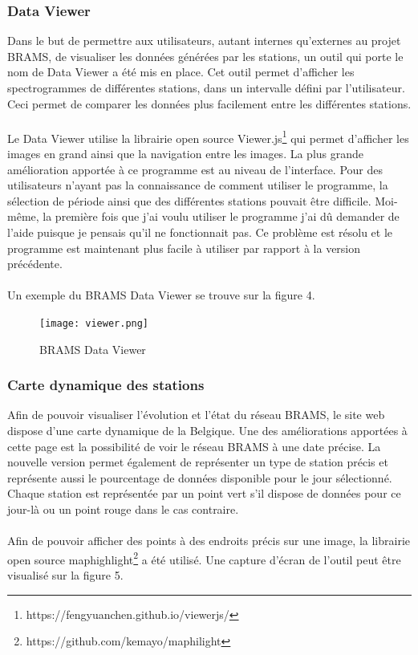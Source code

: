 \documentclass[11pt]{article}
\begin{document}
\subsubsection{Data Viewer}
Dans le but de permettre aux utilisateurs, autant internes qu'externes au projet BRAMS, de visualiser les données générées par les stations, un outil qui porte le nom de Data Viewer a été mis en place.
Cet outil permet d'afficher les spectrogrammes de différentes stations, dans un intervalle défini par l'utilisateur.
Ceci permet de comparer les données plus facilement entre les différentes stations.\\
\\
Le Data Viewer utilise la librairie open source Viewer.js\footnote{https://fengyuanchen.github.io/viewerjs/} qui permet d'afficher les images en grand ainsi que la navigation entre les images.
La plus grande amélioration apportée à ce programme est au niveau de l'interface.
Pour des utilisateurs n'ayant pas la connaissance de comment utiliser le programme, la sélection de période ainsi que des différentes stations pouvait être difficile.
Moi-même, la première fois que j'ai voulu utiliser le programme j'ai dû demander de l'aide puisque je pensais qu'il ne fonctionnait pas.
Ce problème est résolu et le programme est maintenant plus facile à utiliser par rapport à la version précédente.\\
\\
Un exemple du BRAMS Data Viewer se trouve sur la figure 4.

\begin{figure}[t]
    \begin{center}
        \texttt{[image: viewer.png]}
        \caption{BRAMS Data Viewer}
    \end{center}
\end{figure}

\subsubsection{Carte dynamique des stations}
Afin de pouvoir visualiser l'évolution et l'état du réseau BRAMS, le site web dispose d'une carte dynamique de la Belgique.
Une des améliorations apportées à cette page est la possibilité de voir le réseau BRAMS à une date précise.
La nouvelle version permet également de représenter un type de station précis et représente aussi le pourcentage de données disponible pour le jour sélectionné.
Chaque station est représentée par un point vert s'il dispose de données pour ce jour-là ou un point rouge dans le cas contraire.\\
\\
Afin de pouvoir afficher des points à des endroits précis sur une image, la librairie open source maphighlight\footnote{https://github.com/kemayo/maphilight} a été utilisé.
Une capture d'écran de l'outil peut être visualisé sur la figure 5.
\end{document}
